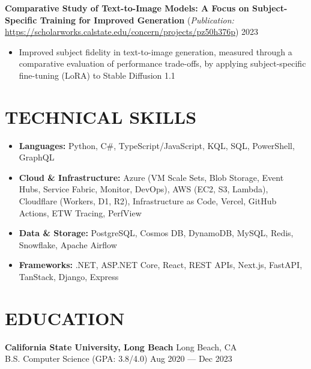 \documentclass[letterpaper,10pt]{extarticle}
\begin{document}
\noindent
\textbf{Comparative Study of Text-to-Image Models: A Focus on Subject-Specific Training for Improved Generation}
(\textit{Publication:} \url{https://scholarworks.calstate.edu/concern/projects/pz50h376p}) \hfill 2023
\begin{itemize}
    \item Improved subject fidelity in text-to-image generation, measured through a comparative evaluation of performance trade-offs, by applying subject-specific fine-tuning (LoRA) to Stable Diffusion 1.1
\end{itemize}

\section*{TECHNICAL SKILLS}
\begin{itemize}
    \item \textbf{Languages:} Python, C\#, TypeScript/JavaScript, KQL, SQL, PowerShell, GraphQL
    \item \textbf{Cloud \& Infrastructure:} Azure (VM Scale Sets, Blob Storage, Event Hubs, Service Fabric, Monitor, DevOps), AWS (EC2, S3, Lambda), Cloudflare (Workers, D1, R2), Infrastructure as Code, Vercel, GitHub Actions, ETW Tracing, PerfView
    \item \textbf{Data \& Storage:} PostgreSQL, Cosmos DB, DynamoDB, MySQL, Redis, Snowflake, Apache Airflow
    \item \textbf{Frameworks:} .NET, ASP.NET Core, React, REST APIs, Next.js, FastAPI, TanStack, Django, Express
\end{itemize}

\section*{EDUCATION}

\noindent
\textbf{California State University, Long Beach} \hfill Long Beach, CA\\
B.S. Computer Science (GPA: 3.8/4.0) \hfill Aug 2020 --- Dec 2023
\end{document}
